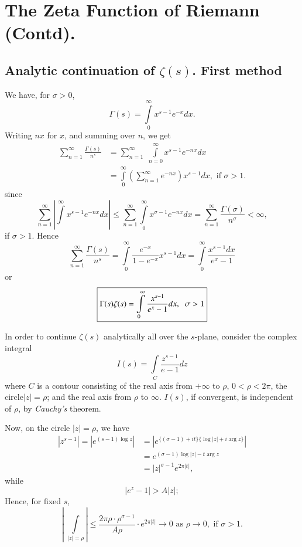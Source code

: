 \chapter{The Zeta Function of Riemann (Contd).}\label{chap11}

\setcounter{section}{2}
\section[Analytic continuation of $\zeta(s)$. First
  method]{Analytic continuation of {\boldmath$\zeta(s)$}. First
  method \cite[p.18]{key16}}\label{chap11:sec3}\pageoriginale 

We have, for $\sigma >0$,
$$
\Gamma (s) = \int\limits^\infty_{0} x^{s-1} e^{-x} dx.
$$
Writing $nx$ for $x$, and summing over $n$, we get
\begin{align*}
\sum\limits^\infty_{n=1} \frac{\Gamma(s)}{n^s} & = \sum^\infty_{n=1}\;
\int\limits^\infty_{n=0} x^{s-1} e^{-nx} dx\\
& = \int\limits^\infty_0 \left(\sum\limits^\infty_{n=1} e^{-nx}
\right) x^{s-1} dx, \text{ if } \sigma >1.
\end{align*}
since 
$$
\sum\limits^\infty_{n=1} \left|\int\limits^\infty x^{s-1} e^{-nx} dx
\right| \leq \sum\limits^\infty_{n=1} \int\limits^\infty_0 x^{\sigma
  -1} e^{-nx} dx = \sum\limits^\infty_{n=1}
\frac{\Gamma(\sigma)}{n^\sigma} < \infty,
$$
if $\sigma >1$. Hence
$$
\sum\limits^\infty_{n=1} \frac{\Gamma(s)}{n^s} = \int\limits^\infty_0
\frac{e^{-x}}{1-e^{-x}}  x^{s-1} dx = \int\limits^\infty_0
\frac{x^{s-1}dx}{e^x -1} 
$$
or
$$
\text{\fbox{$\Gamma(s)\zeta(s) = \int\limits^\infty_{0}
    \dfrac{x^{s-1}}{e^{x}-1} dx , \;\; \sigma >1$}}  
$$

In order to continue $\zeta(s)$ analytically all over the $s$-plane,
consider the complex integral
$$
I(s) = \int\limits_C \frac{z^{s-1}}{e-1} dz
$$
where $C$ is a contour consisting of the real axis from $+ \infty$ to
$\rho$, $0< \rho < 2 \pi$, the circle\pageoriginale $|z| = \rho$; and
the real axis from $\rho$ to $\infty$. $I(s)$, if convergent, is
independent of $\rho$, by {\em Cauchy's} theorem.

Now, on the circle $|z| = \rho$, we have
\begin{align*}
|z^{s-1}| = |e^{(s-1)\log z}| & =|e^{\{(\sigma -1) + it\}\{\log |z| +
  i \arg z\} }| \\
& = e^{(\sigma -1) \log |z| - t \arg z }\\
& = |z|^{\sigma-1} e^{2\pi |t|},
\end{align*}
while
$$
|e^z-1| >  A|z|;
$$
Hence, for fixed $s$, 
$$
\left|\;\int\limits_{|z|=\rho}\right| \leq \frac{2\pi \rho \cdot 
  \rho^{\sigma-1}}{A\rho} \cdot e^{2\pi|t|} \to 0 \text{ as } \rho  \to 
0, \text{ if } \sigma > 1.
$$


